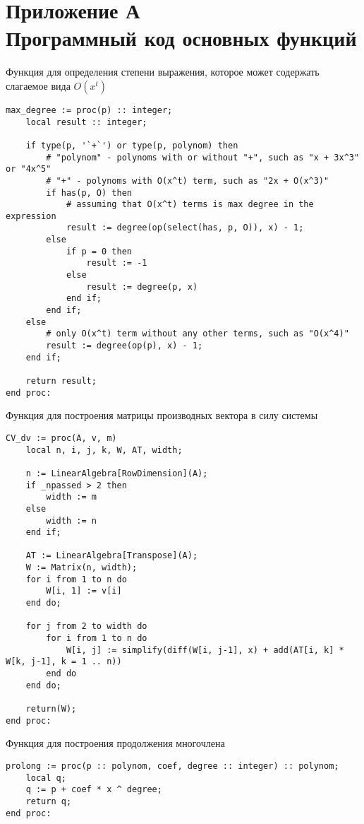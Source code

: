 \section*{Приложение А \\ Программный код основных функций}


Функция для определения степени выражения, которое может содержать слагаемое вида $O(x^t)$
\begin{lstlisting}[basicstyle=\scriptsize]
max_degree := proc(p) :: integer;
    local result :: integer;
    
    if type(p, '`+`') or type(p, polynom) then
        # "polynom" - polynoms with or without "+", such as "x + 3x^3" or "4x^5"
        # "+" - polynoms with O(x^t) term, such as "2x + O(x^3)"
        if has(p, O) then
            # assuming that O(x^t) terms is max degree in the expression
            result := degree(op(select(has, p, O)), x) - 1;
        else
            if p = 0 then
                result := -1
            else
                result := degree(p, x)
            end if;
        end if;
    else
        # only O(x^t) term without any other terms, such as "O(x^4)"
        result := degree(op(p), x) - 1;
    end if;
    
    return result;
end proc:
\end{lstlisting}


\bigskip
Функция для построения матрицы производных вектора в силу системы
\begin{lstlisting}[basicstyle=\scriptsize]
CV_dv := proc(A, v, m)
    local n, i, j, k, W, AT, width;
    
    n := LinearAlgebra[RowDimension](A);
    if _npassed > 2 then
        width := m
    else
        width := n
    end if;
    
    AT := LinearAlgebra[Transpose](A);
    W := Matrix(n, width);
    for i from 1 to n do
        W[i, 1] := v[i]
    end do;
    
    for j from 2 to width do
        for i from 1 to n do
            W[i, j] := simplify(diff(W[i, j-1], x) + add(AT[i, k] * W[k, j-1], k = 1 .. n))
        end do
    end do;
    
    return(W);
end proc:
\end{lstlisting}


\newpage

Функция для построения продолжения многочлена
\begin{lstlisting}[basicstyle=\scriptsize]
prolong := proc(p :: polynom, coef, degree :: integer) :: polynom;
    local q;
    q := p + coef * x ^ degree;
    return q;
end proc:
\end{lstlisting}



